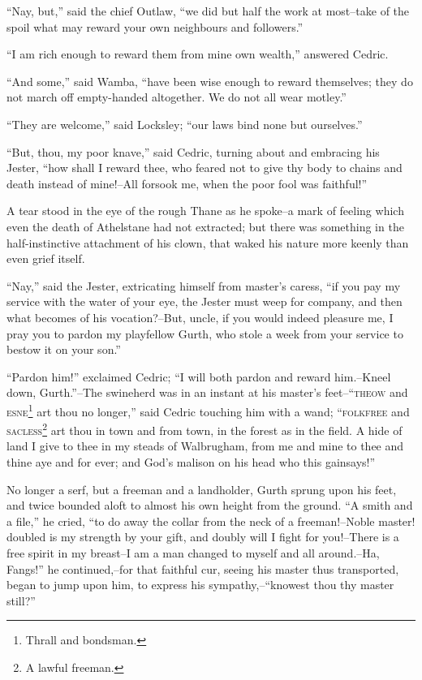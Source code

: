``Nay, but,'' said the chief Outlaw, ``we did but half the work at
most--take of the spoil what may reward your own neighbours and
followers.''

``I am rich enough to reward them from mine own wealth,'' answered
Cedric.

``And some,'' said Wamba, ``have been wise enough to reward themselves;
they do not march off empty-handed altogether. We do not all wear
motley.''

``They are welcome,'' said Locksley; ``our laws bind none but
ourselves.''

``But, thou, my poor knave,'' said Cedric, turning about and embracing
his Jester, ``how shall I reward thee, who feared not to give thy body
to chains and death instead of mine!--All forsook me, when the poor fool
was faithful!''

A tear stood in the eye of the rough Thane as he spoke--a mark of
feeling which even the death of Athelstane had not extracted; but there
was something in the half-instinctive attachment of his clown, that
waked his nature more keenly than even grief itself.

``Nay,'' said the Jester, extricating himself from master's caress, ``if
you pay my service with the water of your eye, the Jester must weep for
company, and then what becomes of his vocation?--But, uncle, if you
would indeed pleasure me, I pray you to pardon my playfellow Gurth, who
stole a week from your service to bestow it on your son.''

``Pardon him!'' exclaimed Cedric; ``I will both pardon and reward
him.--Kneel down, Gurth.''--The swineherd was in an instant at his
master's feet--``\textsc{theow} and \textsc{esne}\footnote{Thrall and
bondsman.} art thou no longer,'' said
Cedric touching him with a wand; ``\textsc{folkfree} and
\textsc{sacless}\footnote{A lawful freeman.} art
thou in town and from town, in the forest as in the field. A hide of
land I give to thee in my steads of Walbrugham, from me and mine to thee
and thine aye and for ever; and God's malison on his head who this
gainsays!''

No longer a serf, but a freeman and a landholder, Gurth sprung upon his
feet, and twice bounded aloft to almost his own height from the ground.
``A smith and a file,'' he cried, ``to do away the collar from the neck
of a freeman!--Noble master! doubled is my strength by your gift, and
doubly will I fight for you!--There is a free spirit in my breast--I am
a man changed to myself and all around.--Ha, Fangs!'' he continued,--for
that faithful cur, seeing his master thus transported, began to jump
upon him, to express his sympathy,--``knowest thou thy master still?''

